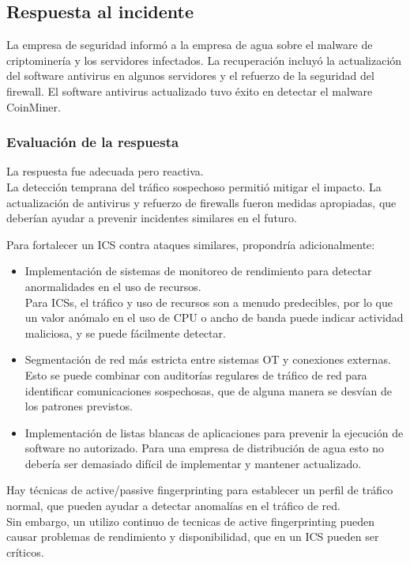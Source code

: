 \subsection{Respuesta al incidente}
La empresa de seguridad informó a la empresa de agua sobre el malware de criptominería y los servidores infectados. La recuperación incluyó la actualización del software antivirus en algunos servidores y el refuerzo de la seguridad del firewall. El software antivirus actualizado tuvo éxito en detectar el malware CoinMiner.

\subsubsection{Evaluación de la respuesta}
La respuesta fue adecuada pero reactiva.\\
La detección temprana del tráfico sospechoso permitió mitigar el impacto.
La actualización de antivirus y refuerzo de firewalls fueron medidas apropiadas, que deberían ayudar a prevenir incidentes similares en el futuro.

Para fortalecer un ICS contra ataques similares, propondría adicionalmente:
\begin{itemize}
    \item Implementación de sistemas de monitoreo de rendimiento para detectar anormalidades en el uso de recursos.\\
        Para ICSs, el tráfico y uso de recursos son a menudo predecibles, por lo que un valor anómalo en el uso de CPU o ancho de banda puede indicar actividad maliciosa, y se puede fácilmente detectar.
        \item Segmentación de red más estricta entre sistemas OT y conexiones externas.
        Esto se puede combinar con auditorías regulares de tráfico de red para identificar comunicaciones sospechosas, que de alguna manera se desvían de los patrones previstos.
        \item Implementación de listas blancas de aplicaciones para prevenir la ejecución de software no autorizado.
        Para una empresa de distribución de agua esto no debería ser demasiado difícil de implementar y mantener actualizado.
\end{itemize}

Hay técnicas de active/passive fingerprinting para establecer un perfil de tráfico normal, que pueden ayudar a detectar anomalías en el tráfico de red.\\
Sin embargo, un utilizo continuo de tecnicas de active fingerprinting pueden causar problemas de rendimiento y disponibilidad, que en un ICS pueden ser críticos.





